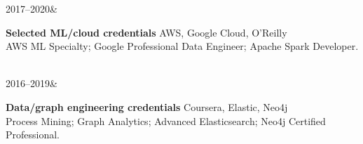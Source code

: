 \documentclass[]{../../../../friggeri-cv}
\renewcommand{\entrytwo}[4]{%
  #1&\parbox[t]{14cm}{%
    \textbf{#2}%
    \hfill%
    {\small\color{textcolor} #3}\\%
    #4\vspace{\parsep}%
  }\\}
\begin{document}
\begin{entrylist2}
    \entrytwo
        {\small 2017--2020}
        {\small Selected ML/cloud credentials}
        {\small AWS, Google Cloud, O'Reilly}
        {\footnotesize AWS ML Specialty; Google Professional Data Engineer; Apache Spark Developer.}
    \entrytwo
        {\small 2016--2019}
        {\small Data/graph engineering credentials}
        {\small Coursera, Elastic, Neo4j}
        {\footnotesize Process Mining; Graph Analytics; Advanced Elasticsearch; Neo4j Certified Professional.}
\end{entrylist2}
\end{document}

